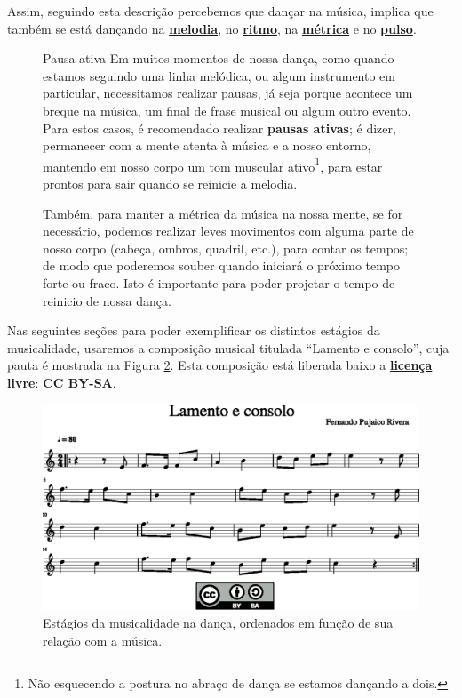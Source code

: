 Assim, seguindo esta descrição percebemos que dançar na música, 
implica que também se está dançando na \hyperref[sec:pos:Melodia]{\textbf{melodia}}, 
no \hyperref[sec:pos:Ritmo]{\textbf{ritmo}}, 
na \hyperref[def:Metrica]{\textbf{métrica}} e 
no \hyperref[ref:Pulso]{\textbf{pulso}}.

\begin{figure}[!bh]
\begin{elaboracion}{Pausa ativa}
\label{ref:pausaativa}
Em muitos momentos de nossa dança, como quando estamos seguindo uma linha melódica,
ou algum instrumento em particular, necessitamos realizar pausas, 
já seja porque acontece um breque na música, um final de frase musical ou algum outro evento.
Para estos casos, é recomendado realizar \textbf{pausas ativas}; é dizer,
permanecer com a mente atenta à música e a nosso entorno, 
mantendo em nosso corpo um tom muscular ativo\footnote{Não 
esquecendo a postura no abraço de dança se estamos dançando a dois. }, 
para estar prontos para sair quando se reinicie a melodia.

Também, para manter a métrica da música na nossa mente,
se for necessário, 
podemos realizar leves movimentos com alguma parte de nosso corpo (cabeça, ombros, quadril, etc.),
para contar os tempos;  
de modo que poderemos souber quando iniciará o próximo tempo forte ou fraco.
Isto é importante para poder projetar o tempo de reinicio de nossa dança.
\end{elaboracion}
\end{figure}

Nas seguintes seções para poder exemplificar os distintos estágios da musicalidade,
usaremos a composição musical titulada ``Lamento e consolo'',
cuja pauta é mostrada na Figura \ref{fig:lamento-e-consolo}.
Esta composição está liberada baixo a 
\hyperref[ref:licensalivre]{\textbf{licença livre}}:
\hyperref[subsec:CCBYSA]{\textbf{CC BY-SA}}.


\begin{figure}
    \centering
    \includegraphics[width=\textwidth]{chapters/cap-musicalidade-tecnica/lamento-e-consolo-1.eps}
    \caption{Estágios da musicalidade na dança, ordenados em função de sua relação com a música.}
    \label{fig:lamento-e-consolo}
\end{figure}






